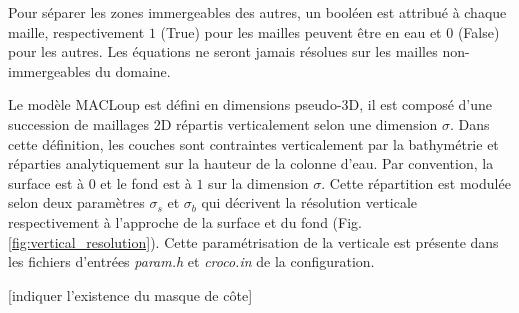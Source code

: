 \documentclass[10pt,a4paper,titlepage]{article}
\begin{document}
Pour séparer les zones immergeables des autres, un booléen est attribué à chaque maille, respectivement $1$ (True) pour les mailles peuvent être en eau et $0$ (False) pour les autres.
Les équations ne seront jamais résolues sur les mailles non-immergeables du domaine.

Le modèle MACLoup est défini en dimensions pseudo-3D, il est composé d'une succession de maillages 2D répartis verticalement selon une dimension $\sigma$.
Dans cette définition, les couches sont contraintes verticalement par la bathymétrie et réparties analytiquement sur la hauteur de la colonne d'eau.
Par convention, la surface est à $0$ et le fond est à $1$ sur la dimension $\sigma$.
Cette répartition est modulée selon deux paramètres $\sigma_{s}$ et $\sigma_{b}$ qui décrivent la résolution verticale respectivement à l'approche de la surface et du fond (Fig. \ref{fig:vertical_resolution}).
Cette paramétrisation de la verticale est présente dans les fichiers d'entrées \textit{param.h} et \textit{croco.in} de la configuration.

[indiquer l'existence du masque de côte]
\end{document}
